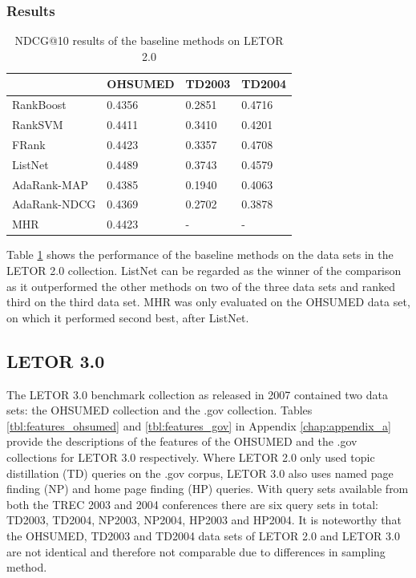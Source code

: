 \subsubsection{Results}
\begin{table}[!h]
\begin{tabular}{l|lll}
 & OHSUMED & TD2003 & TD2004 \\
 \hline 
RankBoost & 0.4356 & 0.2851 & 0.4716 \\ 
Rank\acs{SVM} & 0.4411 & 0.3410 & 0.4201 \\ 
FRank & 0.4423 & 0.3357 & 0.4708 \\ 
ListNet & 0.4489 & 0.3743 & 0.4579 \\ 
AdaRank-\acs{MAP} & 0.4385 & 0.1940 & 0.4063 \\ 
AdaRank-\acs{NDCG} & 0.4369 & 0.2702 & 0.3878 \\ 
\acs{MHR} & 0.4423 & - & - \\ 
\end{tabular}
\caption{\acs{NDCG}@10 results of the baseline methods on LETOR 2.0}
\label{tab:letor2.0_results}
\end{table}
Table \ref{tab:letor2.0_results} shows the performance of the baseline methods on the data sets in the LETOR 2.0 collection. ListNet can be regarded as the winner of the comparison as it outperformed the other methods on two of the three data sets and ranked third on the third data set. \acs{MHR} was only evaluated on the OHSUMED data set, on which it performed second best, after ListNet.


\subsection{LETOR 3.0}
The LETOR 3.0 benchmark collection \cite{Qin2010} as released in 2007 contained two data sets: the OHSUMED collection and the .gov collection. Tables \ref{tbl:features_ohsumed} and \ref{tbl:features_gov} in Appendix \ref{chap:appendix_a} provide the descriptions of the features of the OHSUMED and the .gov collections for LETOR 3.0 respectively. Where LETOR 2.0 only used topic distillation (TD) queries on the .gov corpus, LETOR 3.0 also uses named page finding (NP) and home page finding (HP) queries. With query sets available from both the \ac{TREC} 2003 and 2004 conferences there are six query sets in total: TD2003, TD2004, NP2003, NP2004, HP2003 and HP2004. It is noteworthy that the OHSUMED, TD2003 and TD2004 data sets of LETOR 2.0 and LETOR 3.0 are not identical and therefore not comparable due to differences in sampling method.\\

